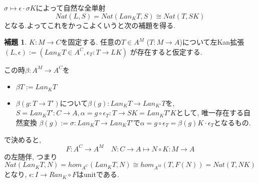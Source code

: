 \documentclass[dvipdfmx,a4paper,11pt]{article}
\theoremstyle{definition}
\newtheorem{lem}[thm]{補題}
\begin{document}
$\sigma \mapsto \epsilon \cdot \sigma K$によって自然な全単射
$$
Nat (L, S)=Nat (Lan_{K}T, S) \cong Nat(T, SK)
$$
となる.よってこれをかっこよくいうと次の補題を得る. 

 \begin{tcolorbox}
 [colback = white, colframe = green!35!black, fonttitle = \bfseries,breakable = true]
\begin{lem}
\label{lem-leftkan-adjoint}
$K : M \to C$を固定する. 
任意の$T \in A^{M}$ ($T : M \to A$)について左Kan拡張
$(L, \epsilon) := (Lan_{K}T \in A^C, \epsilon_{T}: T \to LK)$
が存在すると仮定する.

この時$\beta : A^M \to A^C$を
\begin{itemize}
\item $\beta T := Lan_{K}T$
\item $\beta (g : T \to T')$について$\beta(g) : Lan_{K}T \to Lan_{K'}T$を, 
$S = Lan_{K}T' : C \to A, \alpha =g\circ \epsilon_T : T \to SK = Lan_{K}T' K$として, 唯一存在する自然変換
$\beta(g):=\sigma :  Lan_{K}T \to Lan_{K}T'$で$\alpha =g\circ \epsilon_T  = \beta(g)K \cdot \epsilon_T $となるもの. 
\end{itemize}
で決めると, 
$$
F : A^C \to A^M \quad N :C\to A\mapsto N \circ K : M \to A 
$$
の左随伴, つまり
$$
Nat (Lan_{K}T, N)
=
 hom_{A^C}(Lan_{K}T, N)
 \cong
 hom_{A^M}(T, F(N)) = Nat(T,NK)
$$
となり, $\epsilon :  I \to Ran_{K} \circ F$はunitである. 
\end{lem}
\end{tcolorbox}
\end{document}
